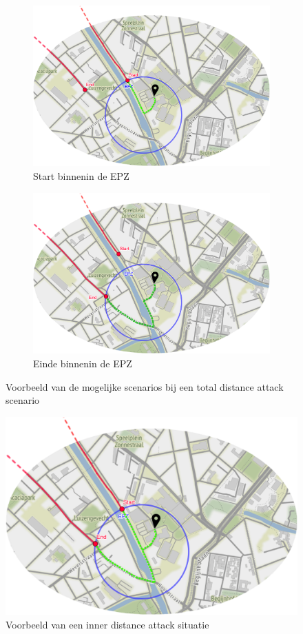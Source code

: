 \begin{figure}[h]
    \centering
    \begin{subfigure}[b]{.5\textwidth}
        \centering
        \caption{Start binnenin de \ac{EPZ}}
        \includegraphics[width=1\textwidth]{fig/TotalDistanceAttacks/start.png}
    \end{subfigure}\hfill
    \begin{subfigure}[b]{.5\textwidth}
        \centering
        \caption{Einde binnenin de \ac{EPZ}}
        \includegraphics[width=1\textwidth]{fig/TotalDistanceAttacks/end.png}
    \end{subfigure}
    \caption{Voorbeeld van de mogelijke scenarios bij een total distance attack scenario}\label{fig:totalDistanceAttack}
\end{figure}
\begin{figure}[h]
    \centering
    \includegraphics[width=.5\textwidth]{fig/TotalDistanceAttacks/InnerDistanceAttack.png}
    \caption{Voorbeeld van een inner distance attack situatie}\label{fig:innerDist}
\end{figure}

